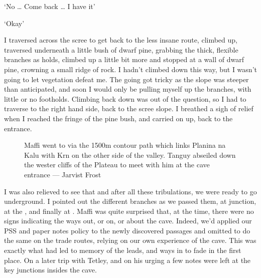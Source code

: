 ‘No … Come back … I have it’

‘Okay’

I traversed across the scree to get back to the less insane route, climbed up, traversed underneath a little bush of dwarf pine, grabbing the thick, flexible branches as holds, climbed up a little bit more and stopped at a wall of dwarf pine, crowning a small ridge of rock. I hadn’t climbed down this way, but I wasn’t going to let vegetation defeat me. The going got tricky as the slope was steeper than anticipated, and soon I would only be pulling myself up the branches, with little or no footholds. Climbing back down was out of the question, so I had to traverse to the right  hand side, back to the scree slope. I breathed a sigh of relief when I reached the fringe of the pine bush, and carried on up, back to the entrance. 

\begin{figure}[t!]
\checkoddpage \ifoddpage \forcerectofloat \else \forceversofloat \fi
\centering
{}
\caption{Maffi went to  via the 1500m contour path which links Planina na Kalu with Krn on the other side of the valley. Tanguy abseiled down the wester cliffs of the Plateau to meet with him at the cave entrance --- Jarvist Frost}
\label{forest}
\end{figure}

I was also relieved to see that  and after all these tribulations, we were ready to go underground. I pointed out the different branches as we passed them, at  junction, at the , and finally at . Maffi was quite surprised that, at the time, there were no signs indicating the ways out, or on, or about the cave. Indeed, we’d applied our PSS and paper notes policy to the newly discovered passages and omitted to do the same on the trade routes, relying on our own experience of the cave. This was exactly what had led to memory of the leads, and ways in  to fade in the first place. On a later trip with Tetley, and on his urging a few notes were left at the key junctions insides the cave.

